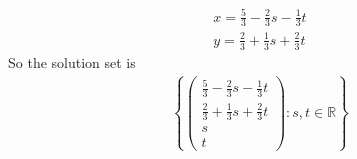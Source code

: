\documentclass[12pt]{article}
\newenvironment{problem}[2][Problem]
{
	\begin{trivlist} 
		\item[\hskip \labelsep {\bfseries #1 #2:}]
	}
{
	\end{trivlist}
	}
\newenvironment{solution}[1][Solution]
{
	\begin{trivlist} 
		\item[\hskip \labelsep {\itshape #1:}]
	}
	{
	\end{trivlist}
}
\begin{document}
\begin{problem}{4}
\begin{solution}
\begin{align*}
x=\frac{5}{3}-\frac{2}{3}s-\frac{1}{3}t\\
y=\frac{2}{3}+\frac{1}{3}s+\frac{2}{3}t
\end{align*}
So the solution set is
\begin{align*}
\left\{\begin{pmatrix} \frac{5}{3} - \frac{2}{3} s - \frac{1}{3} t \\ \frac{2}{3} + \frac{1}{3} s + \frac{2}{3} t \\ s \\ t \end{pmatrix} : s, t \in \mathbb{R}\right\}
\end{align*}
\end{solution}
\end{problem}
\end{document}
